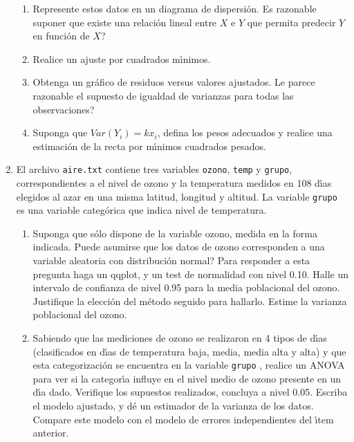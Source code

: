 \documentclass[11pt,a4paper,twoside]{article}%
\begin{document}
\begin{enumerate}
\begin{enumerate}
\item Represente estos datos en un diagrama de dispersi\'{o}n.
\textquestiondown Es razonable suponer que existe una relaci\'{o}n lineal
entre $X$ e $Y$ que permita predecir $Y$ en funci\'{o}n de $X$?

\item Realice un ajuste por cuadrados m\'{\i}nimos.

\item Obtenga un gr\'{a}fico de residuos versus valores ajustados.
\textquestiondown Le parece razonable el supuesto de igualdad de varianzas
para todas las observaciones?

\item Suponga que $Var(Y_{i})=kx_{i}$, defina los pesos adecuados y realice
una estimaci\'{o}n de la recta por m\'{\i}nimos cuadrados pesados.
\end{enumerate}

\item El archivo \texttt{aire.txt} contiene tres variables \texttt{ozono},
\texttt{temp} y \texttt{grupo}, correspondientes a el nivel de ozono y la
temperatura medidos en 108 d\'{\i}as elegidos al azar en una misma latitud,
longitud y altitud. La variable \texttt{grupo} es una variable categ\'{o}rica
que indica nivel de temperatura.

\begin{enumerate}
\item Suponga que s\'{o}lo dispone de la variable ozono, medida en la forma
indicada. \textquestiondown Puede asumirse que los datos de ozono corresponden
a una variable aleatoria con distribuci\'{o}n normal? Para responder a esta
pregunta haga un qqplot, y un test de normalidad con nivel 0.10. Halle un
intervalo de confianza de nivel 0.95 para la media poblacional del ozono.
Justifique la elecci\'{o}n del m\'{e}todo seguido para hallarlo. Estime la
varianza poblacional del ozono.

\item Sabiendo que las mediciones de ozono se realizaron en 4 tipos de
d\'{\i}as (clasificados en d\'{\i}as de temperatura baja, media, media alta y
alta) y que esta categorizaci\'{o}n se encuentra en la variable \texttt{grupo}%
, realice un ANOVA para ver si la categor\'{\i}a influye en el nivel medio de
ozono presente en un d\'{\i}a dado. Verifique los supuestos realizados,
concluya a nivel 0.05. Escriba el modelo ajustado, y d\'{e} un estimador de la
varianza de los datos. Compare este modelo con el modelo de errores
independientes del \'{\i}tem anterior.


\end{enumerate}
\end{enumerate}
\end{document}
